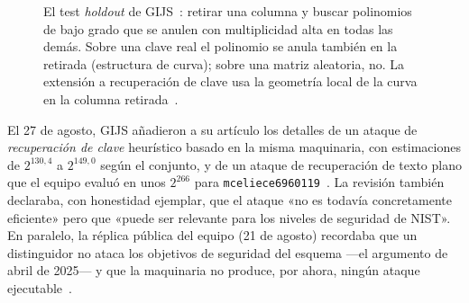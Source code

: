 \begin{figure}[htbp]
\centering
{}
\caption{El test \emph{holdout} de GIJS~\cite{ghoshal2026}: retirar
una columna y buscar polinomios de bajo grado que se anulen con
multiplicidad alta en todas las demás. Sobre una clave real el
polinomio se anula también en la retirada (estructura de curva);
sobre una matriz aleatoria, no. La extensión a recuperación de
clave usa la geometría local de la curva en la columna
retirada~\cite{vedenev2026,weis2026}.}
\label{fig:2026-holdout}
\end{figure}

El 27 de agosto, GIJS añadieron a su artículo los detalles de un
ataque de \emph{recuperación de clave} heurístico basado en la
misma maquinaria, con estimaciones de $2^{130{,}4}$ a $2^{149{,}0}$
según el conjunto, y de un ataque de recuperación de texto plano
que el equipo evaluó en unos $2^{266}$ para
\texttt{mceliece6960119}~\cite{ghoshal2026,cm610}. La revisión
también declaraba, con honestidad ejemplar, que el ataque «no es
todavía concretamente eficiente» pero que «puede ser relevante para
los niveles de seguridad de NIST». En paralelo, la réplica pública
del equipo (21 de agosto) recordaba que un distinguidor no ataca
los objetivos de seguridad del esquema ---el argumento de
abril de 2025--- y que la maquinaria no produce, por ahora, ningún
ataque ejecutable~\cite{bernstein2026,cm529}.

